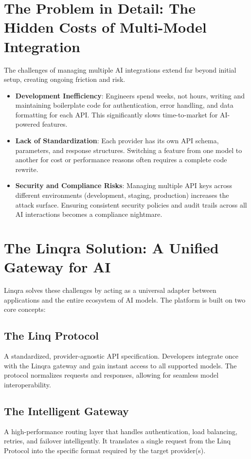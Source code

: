 \documentclass[11pt,a4paper]{article}
\begin{document}
\newpage
\section{The Problem in Detail: The Hidden Costs of Multi-Model Integration}
The challenges of managing multiple AI integrations extend far beyond initial setup, creating ongoing friction and risk.

\begin{itemize}[leftmargin=1.8em]
  \item[\textcolor{linqraprimary}{\faCode}] \textbf{Development Inefficiency}: Engineers spend weeks, not hours, writing and maintaining boilerplate code for authentication, error handling, and data formatting for each API. This significantly slows time-to-market for AI-powered features.
  \item[\textcolor{linqraprimary}{\faRandom}] \textbf{Lack of Standardization}: Each provider has its own API schema, parameters, and response structures. Switching a feature from one model to another for cost or performance reasons often requires a complete code rewrite.
  \item[\textcolor{linqraprimary}{\faLock}] \textbf{Security and Compliance Risks}: Managing multiple API keys across different environments (development, staging, production) increases the attack surface. Ensuring consistent security policies and audit trails across all AI interactions becomes a compliance nightmare.
\end{itemize}

\newpage
\section{The Linqra Solution: A Unified Gateway for AI}
Linqra solves these challenges by acting as a universal adapter between applications and the entire ecosystem of AI models. The platform is built on two core concepts:

\subsection{The Linq Protocol}
A standardized, provider-agnostic API specification. Developers integrate once with the Linqra gateway and gain instant access to all supported models. The protocol normalizes requests and responses, allowing for seamless model interoperability.

\subsection{The Intelligent Gateway}
A high-performance routing layer that handles authentication, load balancing, retries, and failover intelligently. It translates a single request from the Linq Protocol into the specific format required by the target provider(s).
\end{document}
